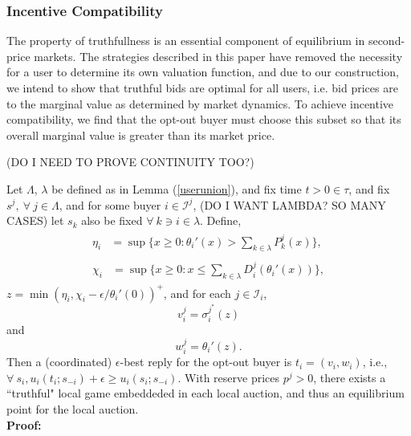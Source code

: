 \documentclass[12pt]{article}
\theoremstyle{definition}
\newcommand{\mcI}{\mathcal{I}}
\newcommand{\g}{\sigma}
\begin{document}
\begin{multicols}{2}
\subsubsection{Incentive Compatibility}

The property of truthfullness is an essential component of equilibrium in
second-price markets. The strategies described in this paper have removed the
necessity for a user to determine its own valuation function, and due to our
construction, we intend to show that truthful bids are optimal for all users,
i.e. bid prices are to the marginal value as determined by market dynamics. 
To achieve incentive compatibility, we find that the opt-out buyer must choose
this subset so that its overall marginal value is greater than its market price.

(DO I NEED TO PROVE CONTINUITY TOO?)

{
Let $\Lambda$, $\lambda$ be defined as in Lemma (\ref{userunion}), and fix time
$t>0 \in \tau$, and fix $s^j, \ \forall \ j\in\Lambda$, and for some
buyer $i\in \mcI^j$, (DO I WANT LAMBDA? SO MANY CASES) let $s_k$ also be fixed $\forall \ k\ni i \in \lambda$. Define,
\begin{align}
\begin{split}\label{eta}
    \eta_i &= \sup\bigg\lbrace x\ge 0 : 
 {\theta_i}'(x) > \displaystyle\sum_{k\in\lambda} P_k^j(x)\bigg\rbrace, 
\end{split}\\
\begin{split}\label{chi}
    \chi_i &= \sup\bigg\lbrace x\ge 0: x \le
\displaystyle\sum_{k\in\lambda}D_i^j(\theta_i'(x)) \bigg\rbrace,
\end{split}
\end{align}
$z = \min(\eta_i, \chi_i - \epsilon / \theta_i'(0))^+$, and for each $j \in
\mcI_i$, 
$$
    v_i^j = \g_i^{j^*}(z) 
$$
and 
$$
    w_i^j = \theta_i'(z).%
$$
Then a (coordinated) $\epsilon$-best reply for the opt-out buyer is $t_i =
(v_i,w_i)$, i.e., $\forall \ s_i, u_i(t_i;s_{-i}) + \epsilon \ge u_i(s_i;
s_{-i})$.
With reserve prices $p^j >0$, there exists a ``truthful" local game embeddeded
in each local auction, and thus an equilibrium point for the local auction. 
}\\
\textbf{Proof:}


\end{multicols}
\end{document}
